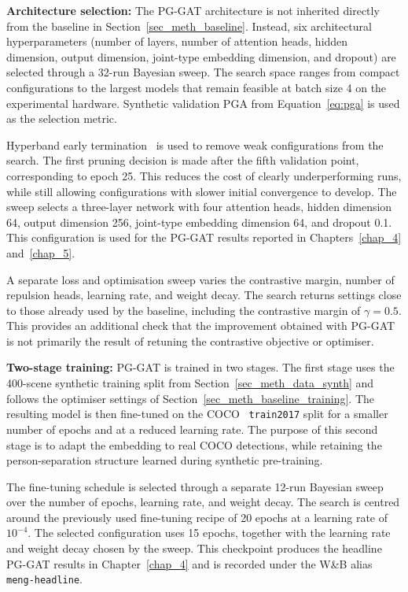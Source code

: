 \textbf{Architecture selection:}
The PG-GAT architecture is not inherited directly from the baseline in
Section~\ref{sec_meth_baseline}.
Instead, six architectural hyperparameters
(number of layers,
number of attention heads,
hidden dimension,
output dimension,
joint-type embedding dimension,
and dropout)
are selected through a 32-run Bayesian sweep.
The search space ranges from compact configurations
to the largest models that remain feasible at batch size 4 on the experimental hardware.
Synthetic validation PGA from Equation~\eqref{eq:pga}
is used as the selection metric.

Hyperband early termination~\cite{li2018hyperband} is used to remove
weak configurations from the search.
The first pruning decision is made after the fifth validation point,
corresponding to epoch 25.
This reduces the cost of clearly underperforming runs,
while still allowing configurations with slower initial convergence
to develop.
The sweep selects a three-layer network with four attention heads,
hidden dimension 64,
output dimension 256,
joint-type embedding dimension 64,
and dropout 0.1.
This configuration is used for the PG-GAT results
reported in Chapters~\ref{chap_4} and~\ref{chap_5}.

A separate loss and optimisation sweep varies the contrastive margin,
number of repulsion heads,
learning rate,
and weight decay.
The search returns settings close to those already used by the baseline,
including the contrastive margin of $\gamma=0.5$.
This provides an additional check that the improvement obtained
with PG-GAT is not primarily the result of retuning
the contrastive objective or optimiser.

\textbf{Two-stage training:}
PG-GAT is trained in two stages.
The first stage uses the 400-scene synthetic training split
from Section~\ref{sec_meth_data_synth}
and follows the optimiser settings of
Section~\ref{sec_meth_baseline_training}.
The resulting model is then fine-tuned on the
COCO~\cite{lin2014coco} \texttt{train2017} split
for a smaller number of epochs and at a reduced learning rate.
The purpose of this second stage is to adapt the embedding
to real COCO detections,
while retaining the person-separation structure learned
during synthetic pre-training.

The fine-tuning schedule is selected through a separate 12-run Bayesian
sweep over the number of epochs,
learning rate,
and weight decay.
The search is centred around the previously used fine-tuning recipe
of 20 epochs at a learning rate of $10^{-4}$.
The selected configuration uses 15 epochs,
together with the learning rate and weight decay chosen by the sweep.
This checkpoint produces the headline PG-GAT results in
Chapter~\ref{chap_4}
and is recorded under the W\&B alias \texttt{meng-headline}.

